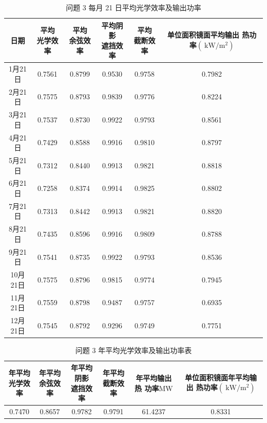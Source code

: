 \documentclass{article}
\numberwithin{equation}{subsection}
\begin{document}
\begin{table}[!htbp]
    \centering
    \begin{tabular}{|c|c|c|c|c|c|}\hline
        日期&\makecell[c]{平均\\光学效率}&\makecell[c]{平均\\余弦效率}&\makecell[c]{平均阴影\\遮挡效率}&\makecell[c]{平均\\截断效率}&\makecell[c]{单位面积镜面平均输出\\热功率$(\mathrm{~kW} / \mathrm{m}^2)$}\\\hline
        1月21日&	0.7561& 	0.8799& 	0.9530& 	0.9758& 	0.7982\\\hline 
        2月21日&	0.7575& 	0.8793& 	0.9839& 	0.9776& 	0.8224 \\\hline 
        3月21日&	0.7537& 	0.8730& 	0.9922& 	0.9793 &	0.8561 \\\hline 
        4月21日&	0.7429& 	0.8588& 	0.9916 &	0.9810 &	0.8797 \\\hline 
        5月21日&	0.7312& 	0.8440& 	0.9913 &	0.9821 &	0.8818 \\\hline 
        6月21日&	0.7258& 	0.8374& 	0.9914 &	0.9825 &	0.8802 \\\hline 
        7月21日&	0.7313& 	0.8442& 	0.9913 &	0.9821 &	0.8820 \\\hline 
        8月21日&	0.7435& 	0.8596& 	0.9916 &	0.9809 &	0.8788 \\\hline 
        9月21日&	0.7541& 	0.8735& 	0.9922 &	0.9793 &	0.8536 \\\hline 
        10月21日&	0.7575& 	0.8796& 	0.9815 &	0.9774 &	0.7945 \\\hline 
        11月21日&	0.7559& 	0.8798 &	0.9487 &	0.9757 &	0.6935 \\\hline 
        12月21日&	0.7545& 	0.8792& 	0.9296 &	0.9749 &	0.7751 \\\hline 
    \end{tabular}
    \caption{问题 3 每月 21 日平均光学效率及输出功率}
\end{table}

\begin{table}[!htbp]
    \centering
    \begin{tabular}{|c|c|c|c|c|c|}\hline
        \makecell[c]{年平均\\光学效率}&\makecell[c]{年平均\\余弦效率}&\makecell[c]{年平均阴影\\遮挡效率}&\makecell[c]{年平均\\截断效率}&\makecell[c]{年平均输出热\\功率$\mathrm{MW}$}&\makecell[c]{单位面积镜面年平均输出\\热功率$(\mathrm{~kW} / \mathrm{m}^2)$}\\\hline
        0.7470& 	0.8657& 	0.9782& 	0.9791& 	61.4237& 	0.8331 
        \\\hline
    \end{tabular}
    \caption{问题 3 年平均光学效率及输出功率表}
\end{table}
\end{document}
